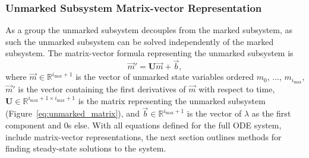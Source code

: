 \documentclass[review]{elsarticle}
\newcommand{\imax}{\ensuremath{i_{\max}}\xspace}
\let\bs\boldsymbol
\begin{document}
\subsubsection{Unmarked Subsystem Matrix-vector Representation}
As a group the unmarked subsystem decouples from the marked subsystem, as such the unmarked subsystem can be solved independently of the marked subsystem.  
The matrix-vector formula representing the unmarked subsystem is \begin{equation}\label{eq:matrix_unmarked}\vec{m}'=\bs{U}\vec{m}+\vec{b},\end{equation} where $\vec{m}\in\mathbb{R}^{\imax+1}$ is the vector of unmarked state variables ordered $m_0$, ..., $m_{\imax}$, $\vec{m}'$ is the vector containing the first derivatives of $\vec{m}$ with respect to time, $\bs{U}\in\mathbb{R}^{\imax+1\times \imax+1}$ is the matrix representing the unmarked subsystem (Figure~\ref{eq:unmarked_matrix}), and $\vec{b}\in\mathbb{R}^{\imax+1}$ is the vector of $\lambda$ as the first component and 0s else.
With all equations defined for the full ODE system, include matrix-vector representations, the next section outlines methods for finding steady-state solutions to the system.
\end{document}
